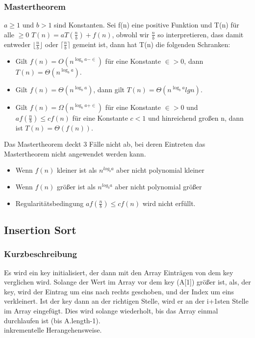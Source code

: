 \documentclass[jou,apacite]{apa6}
\begin{document}
\subsubsection{Mastertheorem}
$a\ge 1$ und $b>1$ sind Konstanten. Sei f(n) eine positive Funktion und T(n) für alle $\ge0$ $T(n) = aT(\frac{n}{b}) + f(n)$, obwohl wir $\frac{n}{b}$ so interpretieren, dass damit entweder $\lfloor{\frac{n}{b}}\rfloor$ oder $\lceil{\frac{n}{b}}\rceil$ gemeint ist, dann hat T(n) die folgenden Schranken:
\begin{itemize}
    \item Gilt $f(n) = O(n^{\log_b{a-\in}} )$ für eine Konstante $\in > 0$, dann $T(n) = \Theta(n^{\log_b{a}})$.
    \item Gilt $f(n) = \Theta(n^{\log_b{a}})$, dann gilt $T(n) = \Theta(n^{\log_b{a}}lg n)$.
    \item Gilt $f(n) = \Omega(n^{\log_b{a+\in}} )$ für eine Konstante $\in > 0$ und $af(\frac{n}{b})\le cf(n)$ für eine Konstante $c<1$ und hinreichend großen n, dann ist $T(n) = \Theta(f(n))$.
\end{itemize}
Das Mastertheorem deckt 3 Fälle nicht ab, bei deren Eintreten das Mastertheorem nicht angewendet werden kann.
\begin{itemize}
    \item Wenn $f(n)$ kleiner ist als $n^{log_ba}$ aber nicht polynomial kleiner
    \item Wenn $f(n)$ größer ist als $n^{log_ba}$ aber nicht polynomial größer
    \item Regularitätsbedingung $af(\frac{n}{b})\le cf(n)$ wird nicht erfüllt.
\end{itemize}



\subsection{Insertion Sort}

\subsubsection{Kurzbeschreibung}
Es wird ein key initialisiert, der dann mit den Array Einträgen von dem key verglichen wird. Solange der Wert im Array vor dem key (A[1]) größer ist, als, der key, wird der Eintrag um eins nach rechts geschoben, und der Index um eins verkleinert. Ist der key dann an der richtigen Stelle, wird er an der i+1sten Stelle im Array eingefügt. Dies wird solange wiederholt, bis das Array einmal durchlaufen ist (bis A.length-1). \\
inkrementelle Herangehensweise.
\end{document}
